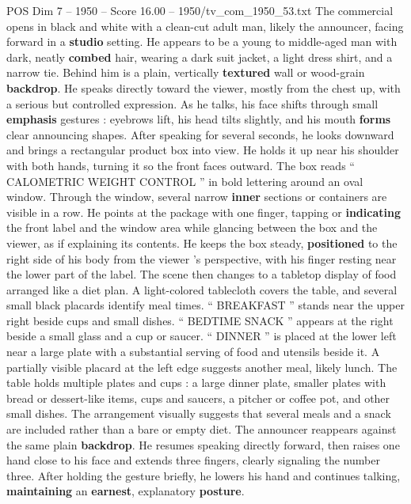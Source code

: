 \begin{textsample}{POS Dim 7 – 1950 – Score 16.00 – 1950/tv\_com\_1950\_53.txt}  \label{ex:f7_pos_011}
The commercial opens in black and white with a clean-cut adult man, likely the announcer, facing forward in a \textbf{studio} setting.
He appears to be a young to middle-aged man with dark, neatly \textbf{combed} hair, wearing a dark suit jacket, a light dress shirt, and a narrow tie.
Behind him is a plain, vertically \textbf{textured} wall or wood-grain \textbf{backdrop}.
He speaks directly toward the viewer, mostly from the chest up, with a serious but controlled expression.
As he talks, his face shifts through small \textbf{emphasis} gestures : eyebrows lift, his head tilts slightly, and his mouth \textbf{forms} clear announcing shapes.
After speaking for several seconds, he looks downward and brings a rectangular product box into view.
He holds it up near his shoulder with both hands, turning it so the front faces outward.
The box reads “ CALOMETRIC WEIGHT CONTROL ” in bold lettering around an oval window.
Through the window, several narrow \textbf{inner} sections or containers are visible in a row.
He points at the package with one finger, tapping or \textbf{indicating} the front label and the window area while glancing between the box and the viewer, as if explaining its contents.
He keeps the box steady, \textbf{positioned} to the right side of his body from the viewer ’s perspective, with his finger resting near the lower part of the label.
The scene then changes to a tabletop display of food arranged like a diet plan.
A light-colored tablecloth covers the table, and several small black placards identify meal times. “ BREAKFAST ” stands near the upper right beside cups and small dishes. “ BEDTIME SNACK ” appears at the right beside a small glass and a cup or saucer. “ DINNER ” is placed at the lower left near a large plate with a substantial serving of food and utensils beside it.
A partially visible placard at the left edge suggests another meal, likely lunch.
The table holds multiple plates and cups : a large dinner plate, smaller plates with bread or dessert-like items, cups and saucers, a pitcher or coffee pot, and other small dishes.
The arrangement visually suggests that several meals and a snack are included rather than a bare or empty diet.
The announcer reappears against the same plain \textbf{backdrop}.
He resumes speaking directly forward, then raises one hand close to his face and extends three fingers, clearly signaling the number three.
After holding the gesture briefly, he lowers his hand and continues talking, \textbf{maintaining} an \textbf{earnest}, explanatory \textbf{posture}.

\end{textsample}
